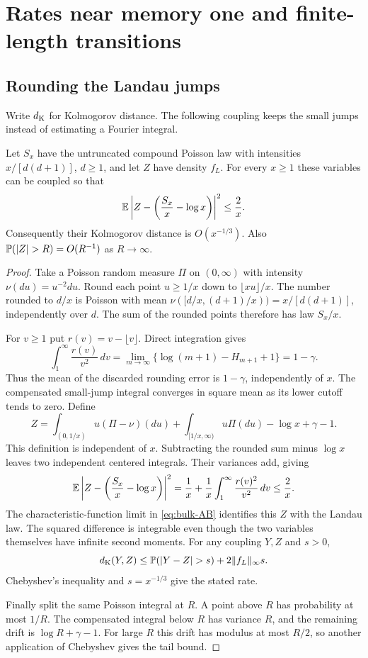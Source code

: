 \section{Rates near memory one and finite-length transitions}
\label{app:fixed-refinements}

\subsection{Rounding the Landau jumps}

Write $d_{\rm K}$ for Kolmogorov distance. The following coupling
keeps the small jumps instead of estimating a Fourier integral.

\begin{lemma}\label{lem:landau-rounding}
Let $S_x$ have the untruncated compound Poisson law with intensities
$x/[d(d+1)]$, $d\ge1$, and let $Z$ have density $f_L$.
For every $x\ge1$ these variables can be coupled so that
\[
 \mathbb{E}\left|Z-\left(\frac{S_x}{x}-\log x\right)\right|^2\le\frac2x.
\]
Consequently their Kolmogorov distance is $O(x^{-1/3})$.
Also $\Prob(|Z|>R)=O(R^{-1})$ as $R\to\infty$.
\end{lemma}

\begin{proof}
Take a Poisson random measure $\Pi$ on $(0,\infty)$ with intensity
$\nu(du)=u^{-2}du$. Round each point $u\ge1/x$ down to
$\lfloor xu\rfloor/x$. The number rounded to $d/x$ is Poisson
with mean $\nu([d/x,(d+1)/x))=x/[d(d+1)]$, independently over $d$.
The sum of the rounded points therefore has law $S_x/x$.

For $v\ge1$ put $r(v)=v-\lfloor v\rfloor$. Direct integration gives
\[
 \int_1^\infty\frac{r(v)}{v^2}\,dv
 =\lim_{m\to\infty}\{\log(m+1)-H_{m+1}+1\}=1-\gamma.
\]
Thus the mean of the discarded rounding error is $1-\gamma$,
independently of $x$. The compensated small-jump integral converges
in square mean as its lower cutoff tends to zero. Define
\[
 Z=\int_{(0,1/x)}u(\Pi-\nu)(du)
   +\int_{[1/x,\infty)}u\Pi(du)-\log x+\gamma-1.
\]
This definition is independent of $x$. Subtracting the rounded sum
minus $\log x$ leaves two independent centered integrals. Their
variances add, giving
\[
 \mathbb{E}\left|Z-\left(\frac{S_x}{x}-\log x\right)\right|^2
 =\frac1x+\frac1x\int_1^\infty\frac{r(v)^2}{v^2}\,dv\le\frac2x.
\]
The characteristic-function limit in \eqref{eq:bulk-AB} identifies
this $Z$ with the Landau law. The squared difference is integrable
even though the two variables themselves have infinite second moments.
For any coupling $Y,Z$ and $s>0$,
\[
 d_{\rm K}(Y,Z)\le\Prob(|Y-Z|>s)+2\|f_L\|_\infty s.
\]
Chebyshev's inequality and $s=x^{-1/3}$ give the stated rate.

Finally split the same Poisson integral at $R$. A point above $R$
has probability at most $1/R$. The compensated integral below $R$
has variance $R$, and the remaining drift is $\log R+\gamma-1$.
For large $R$ this drift has modulus at most $R/2$, so another
application of Chebyshev gives the tail bound.
\end{proof}

